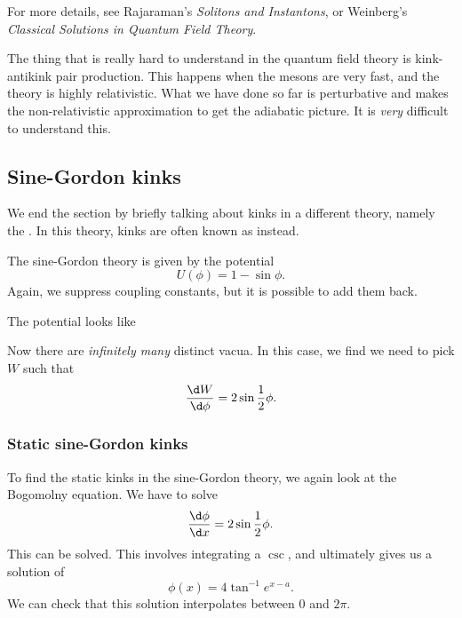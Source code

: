 \documentclass[a4paper]{article}
\begin{document}
For more details, see Rajaraman's \emph{Solitons and Instantons}, or Weinberg's \emph{Classical Solutions in Quantum Field Theory}.

The thing that is really hard to understand in the quantum field theory is kink-antikink pair production. This happens when the mesons are very fast, and the theory is highly relativistic. What we have done so far is perturbative and makes the non-relativistic approximation to get the adiabatic picture. It is \emph{very} difficult to understand this.

\subsection{Sine-Gordon kinks}
We end the section by briefly talking about kinks in a different theory, namely the . In this theory, kinks are often known as  instead.

The sine-Gordon theory is given by the potential
\[
  U(\phi) = 1 - \sin \phi.
\]
Again, we suppress coupling constants, but it is possible to add them back.

The potential looks like
\begin{center}
\end{center}
Now there are \emph{infinitely many} distinct vacua. In this case, we find we need to pick $W$ such that
\[
  \frac{\d W}{\d \phi} = 2 \sin \frac{1}{2}\phi. %
\]

\subsubsection*{Static sine-Gordon kinks}
To find the static kinks in the sine-Gordon theory, we again look at the Bogomolny equation. We have to solve
\[
  \frac{\d \phi}{\d x} = 2 \sin \frac{1}{2}\phi.
\]
This can be solved. This involves integrating a $\csc$, and ultimately gives us a solution of
\[
  \phi(x) = 4 \tan^{-1} e^{x - a}.
\]
We can check that this solution interpolates between $0$ and $2\pi$.
\end{document}
